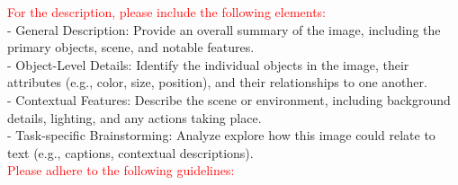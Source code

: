 \begin{figure*}[t]
\begin{prompt}[title={Prompt: Synthesizing Retrieval Data (With Document Images)}, label=prompt:ret_three_image]
\textcolor{red}{For the description, please include the following elements:}\\
- General Description: Provide an overall summary of the image, including the primary objects, scene, and notable features.\\
- Object-Level Details: Identify the individual objects in the image, their attributes (e.g., color, size, position), and their relationships to one another.\\
- Contextual Features: Describe the scene or environment, including background details, lighting, and any actions taking place.\\
- Task-specific Brainstorming: Analyze explore how this image could relate to text (e.g., captions, contextual descriptions).\\

\textcolor{red}{Please adhere to the following guidelines:}


\end{prompt}
\end{figure*}
